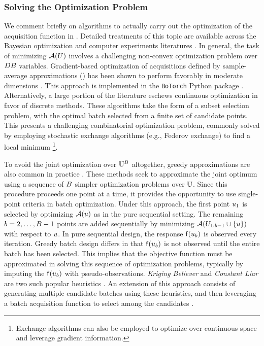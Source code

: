 \documentclass[12pt]{article}
\begin{document}
\subsubsection{Solving the Optimization Problem}
We comment briefly on algorithms to actually carry out the optimization of the acquisition 
function in . Detailed treatments of this topic are available across the Bayesian 
optimization and computer experiments literatures \citep{maxAcq,botorch,gramacy2020surrogates,WynnDiscreteExchange}.
In general, the task of minimizing $\mathcal{A}(U)$ involves a challenging non-convex optimization problem over
$DB$ variables. Gradient-based optimization of acquisitions defined by sample-average approximations
() has been shown to perform favorably in moderate dimensions \citet{Mercer_kernels_IVAR}.
This approach is implemented in the \verb+BoTorch+ Python package \citep{botorch}. Alternatively, a large portion of the literature 
eschews continuous optimization in favor of discrete methods. These algorithms take the form of a subset selection 
problem, with the optimal batch selected from a finite set of candidate points. This presents a 
challenging combinatorial optimization problem, commonly solved by employing stochastic exchange 
algorithms (e.g., Federov exchange) to find a local minimum \citep{FederovExchange,WynnDiscreteExchange,LOEPPKY20101452}
\footnote{Exchange algorithms can also be employed to optimize over continuous space and leverage gradient information.}.

To avoid the joint optimization over $\mathbb{U}^{B}$ altogether, greedy approximations are also common in 
practice \citep{VehtariParallelGP,Surer2023sequential}. These methods seek to approximate the 
joint optimum using a sequence of $B$ simpler optimization problems over $\mathbb{U}$. 
Since this procedure proceeds one point at a time, it provides the opportunity to use single-point criteria in batch optimization. 
Under this approach, the first point $u_1$ is selected
by optimizing $\mathcal{A}(u)$ as in the pure sequential setting. The remaining $b = 2, \dots, B - 1$ points are added
sequentially by minimizing $\mathcal{A}(U_{1:b-1} \cup \{u\})$ with respect to $u$. In pure sequential design, 
the response $\mathsf{f}(u_b)$ is observed every iteration. Greedy batch design differs in that $\mathsf{f}(u_b)$
is not observed until the entire batch has been selected. This implies that the objective function must be 
approximated in solving this sequence of optimization problems, typically by imputing the $\mathsf{f}(u_b)$
with pseudo-observations. \textit{Kriging Believer} and \textit{Constant Liar} are two such popular heuristics
\citep{Ginsbourger2010}. An extension of this approach consists of generating multiple candidate 
batches using these heuristics, and then leveraging a batch acquisition function to select among
the candidates \citep{Chevalier2013}. 
\end{document}
